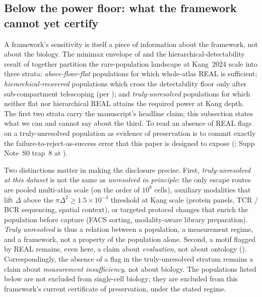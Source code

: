 
\subsection*{Below the power floor: what the framework cannot yet certify}
\label{sec:below-floor-epistemic}

A framework's sensitivity is itself a piece of information about the framework, not about the biology. The minimax envelope of  and the hierarchical-detectability result of  together partition the rare-population landscape at Kang~2024 scale into three strata: \emph{above-floor-flat} populations for which whole-atlas REAL is sufficient; \emph{hierarchical-recovered} populations which cross the detectability floor only after sub-compartment telescoping (per ); and \emph{truly-unresolved} populations for which neither flat nor hierarchical REAL attains the required power at Kang depth. The first two strata carry the manuscript's headline claim; this subsection states what we can and cannot say about the third. To read an absence of \textsc{REAL} flags on a truly-unresolved population as evidence of preservation is to commit exactly the failure-to-reject-as-success error that this paper is designed to expose (; Supp Note~S0 trap~8 at ).

Two distinctions matter in making the disclosure precise. First, \textit{truly-unresolved at this dataset} is not the same as \textit{unresolved in principle}: the only escape routes are pooled multi-atlas scale (on the order of $10^{8}$ cells), auxiliary modalities that lift $\Delta$ above the $\pi \Delta^{2} \geq 1.5 \times 10^{-4}$ threshold at Kang scale (protein panels, TCR / BCR sequencing, spatial context), or targeted protocol changes that enrich the population before capture (FACS sorting, modality-aware library preparation). \textit{Truly unresolved} is thus a relation between a population, a measurement regime, and a framework, not a property of the population alone. Second, a motif flagged by \textsc{REAL} remains, even here, a claim about \emph{evaluation}, not about ontology (). Correspondingly, the absence of a flag in the truly-unresolved stratum remains a claim about \emph{measurement insufficiency}, not about biology. The populations listed below are not excluded from single-cell biology; they are excluded from this framework's current certificate of preservation, under the stated regime.

